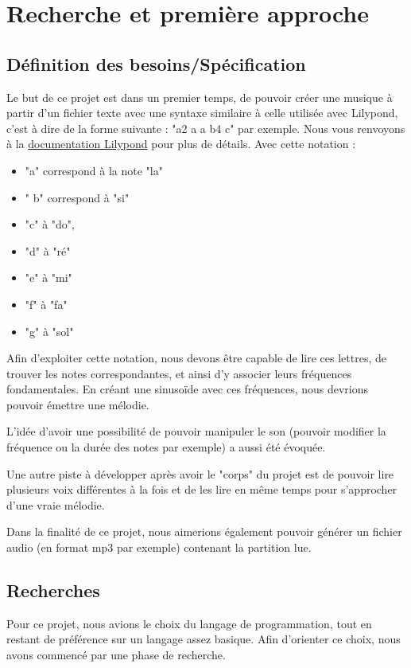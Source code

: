 \documentclass{EPUProjetPeiP}
\begin{document}
\section{Recherche et première approche}

\subsection{Définition des besoins/Spécification}

Le but de ce projet est dans un premier temps, de pouvoir créer une musique à partir d'un fichier texte avec une syntaxe similaire à celle utilisée avec Lilypond, c'est à dire de la forme suivante : "a2 a a b4 c" par exemple. Nous vous renvoyons à la
\href{http://lilypond.org/text-input.html}{documentation Lilypond} pour plus de détails.
Avec cette notation : 
\begin{itemize}
\item "a" correspond à la note "la"
\item " b" correspond à "si"
\item  "c" à "do",
\item "d" à "ré"
\item "e" à "mi"
\item "f" à "fa"
\item "g" à "sol"
\end{itemize}
Afin d'exploiter cette notation, nous devons être capable de lire ces lettres, de trouver les notes correspondantes, et ainsi d'y associer leurs fréquences fondamentales.
En créant une sinusoïde avec ces fréquences, nous devrions pouvoir émettre une mélodie.

L'idée d'avoir une possibilité de pouvoir manipuler le son (pouvoir modifier la fréquence ou la durée des notes par exemple) a aussi été évoquée.

Une autre piste à développer après avoir le "corps" du projet est de pouvoir lire plusieurs voix différentes à la fois et de les lire en même temps pour 
s'approcher d'une vraie mélodie.

Dans la finalité de ce projet, nous aimerions également pouvoir générer un fichier audio (en format mp3 par exemple) contenant la partition lue.


\subsection{Recherches}

Pour ce projet, nous avions le choix du langage de programmation, tout en restant de préférence sur un langage assez basique. Afin 
d'orienter ce choix, nous avons commencé par une phase de recherche.
\end{document}
